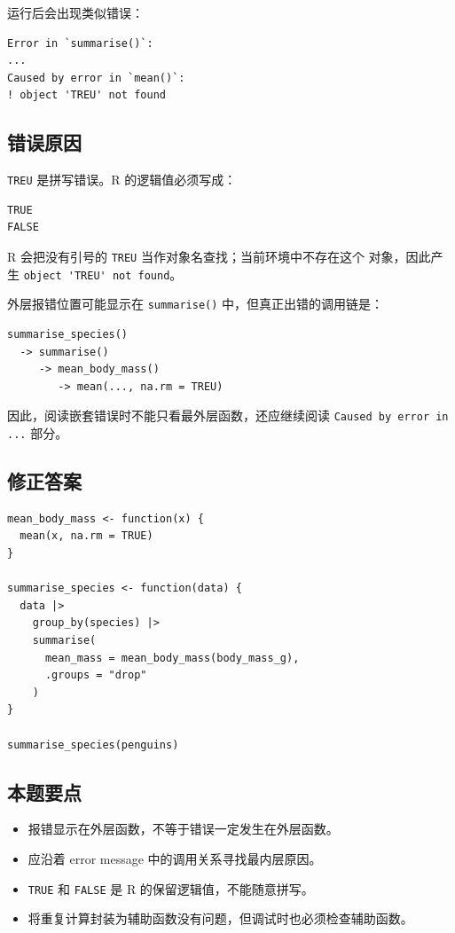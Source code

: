 \documentclass[11pt,a4paper]{ctexart}
\begin{document}
运行后会出现类似错误：

\begin{lstlisting}[style=textcode]
Error in `summarise()`:
...
Caused by error in `mean()`:
! object 'TREU' not found
\end{lstlisting}

\subsection{错误原因}

\lstinline|TREU| 是拼写错误。R 的逻辑值必须写成：

\begin{lstlisting}[style=rcode]
TRUE
FALSE
\end{lstlisting}

R 会把没有引号的 \lstinline|TREU| 当作对象名查找；当前环境中不存在这个
对象，因此产生 \lstinline|object 'TREU' not found|。

外层报错位置可能显示在 \lstinline|summarise()| 中，但真正出错的调用链是：

\begin{lstlisting}[style=textcode]
summarise_species()
  -> summarise()
     -> mean_body_mass()
        -> mean(..., na.rm = TREU)
\end{lstlisting}

因此，阅读嵌套错误时不能只看最外层函数，还应继续阅读
\texttt{Caused by error in ...} 部分。

\subsection{修正答案}

\begin{lstlisting}[style=rcode]
mean_body_mass <- function(x) {
  mean(x, na.rm = TRUE)
}

summarise_species <- function(data) {
  data |>
    group_by(species) |>
    summarise(
      mean_mass = mean_body_mass(body_mass_g),
      .groups = "drop"
    )
}

summarise_species(penguins)
\end{lstlisting}

\subsection{本题要点}

\begin{itemize}
  \item 报错显示在外层函数，不等于错误一定发生在外层函数。
  \item 应沿着 error message 中的调用关系寻找最内层原因。
  \item \lstinline|TRUE| 和 \lstinline|FALSE| 是 R 的保留逻辑值，不能随意拼写。
  \item 将重复计算封装为辅助函数没有问题，但调试时也必须检查辅助函数。
\end{itemize}
\end{document}
